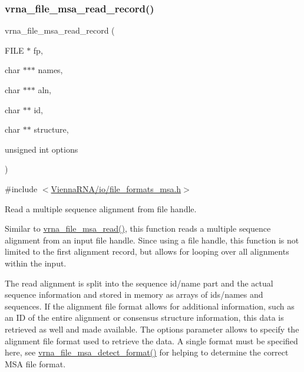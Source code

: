 \mbox{\label{group__file__formats__msa_ga59204cd1daa4927f5127cc65a2886efd}} 
\subsubsection{\texorpdfstring{vrna\+\_\+file\+\_\+msa\+\_\+read\+\_\+record()}{vrna\_file\_msa\_read\_record()}}
{\footnotesize\ttfamily vrna\+\_\+file\+\_\+msa\+\_\+read\+\_\+record (\begin{DoxyParamCaption}\item[{F\+I\+LE $\ast$}]{fp,  }\item[{char $\ast$$\ast$$\ast$}]{names,  }\item[{char $\ast$$\ast$$\ast$}]{aln,  }\item[{char $\ast$$\ast$}]{id,  }\item[{char $\ast$$\ast$}]{structure,  }\item[{unsigned int}]{options }\end{DoxyParamCaption})}



{\ttfamily \#include $<$\hyperlink{io_2file__formats__msa_8h}{Vienna\+R\+N\+A/io/file\+\_\+formats\+\_\+msa.\+h}$>$}



Read a multiple sequence alignment from file handle. 

Similar to \hyperlink{group__file__formats__msa_ga08a01c40ac5f5e0e04e9ae2258c99aa6}{vrna\+\_\+file\+\_\+msa\+\_\+read()}, this function reads a multiple sequence alignment from an input file handle. Since using a file handle, this function is not limited to the first alignment record, but allows for looping over all alignments within the input.

The read alignment is split into the sequence id/name part and the actual sequence information and stored in memory as arrays of ids/names and sequences. If the alignment file format allows for additional information, such as an ID of the entire alignment or consensus structure information, this data is retrieved as well and made available. The {\ttfamily options} parameter allows to specify the alignment file format used to retrieve the data. A single format must be specified here, see \hyperlink{group__file__formats__msa_ga627ac281b5f11c63861726e6472626c9}{vrna\+\_\+file\+\_\+msa\+\_\+detect\+\_\+format()} for helping to determine the correct M\+SA file format.

